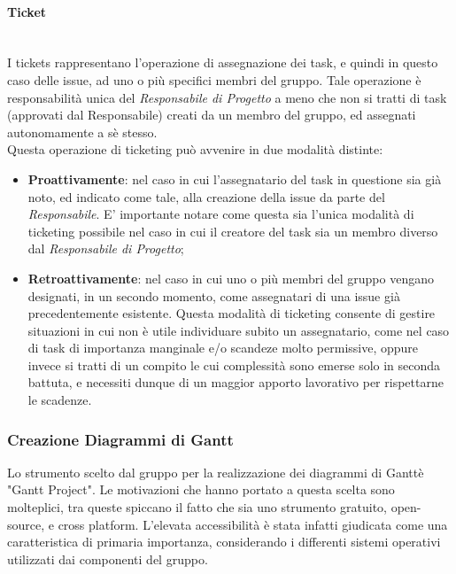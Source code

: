 \paragraph{Ticket} ~\\
I tickets rappresentano l'operazione di assegnazione dei task, e quindi in questo caso delle issue, ad uno o più specifici membri del gruppo. Tale operazione è responsabilità unica del \textit{Responsabile di Progetto} a meno che non si tratti di task (approvati dal Responsabile) creati da un membro del gruppo, ed assegnati autonomamente a sè stesso.\\
Questa operazione di ticketing può avvenire in due modalità distinte:
\begin{itemize}
	\item \textbf{Proattivamente}: nel caso in cui l'assegnatario del task in questione sia già noto, ed indicato come tale, alla creazione della issue da parte del \textit{Responsabile}. E' importante notare come questa sia l'unica modalità di ticketing possibile nel caso in cui il creatore del task sia un membro diverso dal \textit{Responsabile di Progetto};
	\item \textbf{Retroattivamente}: nel caso in cui uno o più membri del gruppo vengano designati, in un secondo momento, come assegnatari di una issue già precedentemente esistente. Questa modalità di ticketing consente di gestire situazioni in cui non è utile individuare subito un assegnatario, come nel caso di task di importanza manginale e/o scandeze molto permissive, oppure invece si tratti di un compito le cui complessità sono emerse solo in seconda battuta, e necessiti dunque di un maggior apporto lavorativo per rispettarne le scadenze.
\end{itemize}

\subsubsection{Creazione Diagrammi di Gantt}
	Lo strumento scelto dal gruppo per la realizzazione dei diagrammi di Gantt\glossario è "Gantt Project". Le 					motivazioni che hanno portato a questa scelta sono molteplici, tra queste spiccano il fatto che sia uno strumento 	gratuito, open-source\glossario, e cross platform. L'elevata accessibilità è stata infatti 				giudicata come una caratteristica di primaria importanza, considerando i differenti sistemi operativi utilizzati 		dai componenti del gruppo.

